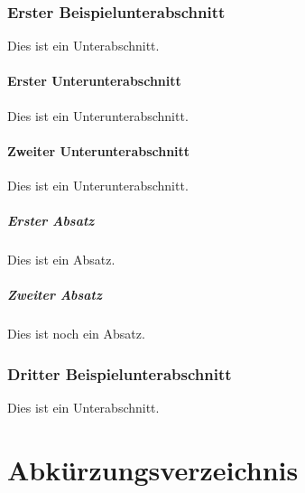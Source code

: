 \documentclass[12pt,oneside,a4paper,bibtotoc,liststotoc]{scrreprt}
\begin{document}
\subsection{Erster Beispielunterabschnitt}

Dies ist ein Unterabschnitt.

\subsubsection{Erster Unterunterabschnitt}

Dies ist ein Unterunterabschnitt.

\subsubsection{Zweiter Unterunterabschnitt}

Dies ist ein Unterunterabschnitt.

\paragraph{Erster Absatz} Dies ist ein Absatz.

\paragraph{Zweiter Absatz} Dies ist noch ein Absatz.

\subsection{Dritter Beispielunterabschnitt}
\label{dritter_beispielunterabschnitt}

Dies ist ein Unterabschnitt.

\chapter*{Abkürzungsverzeichnis}
\begin{acronym}[Acronms]

\end{acronym}

{}

\listoffigures

\listoftables

\lstlistoflistings


\appendix
\end{document}
